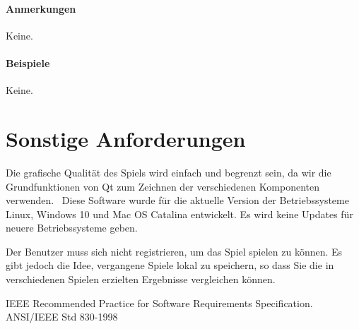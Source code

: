 \documentclass[a4paper, twosided, 11pt]{scrartcl}
\begin{document}
\paragraph{Anmerkungen} Keine.
\paragraph{Beispiele} Keine.

\section{Sonstige Anforderungen}

Die grafische Qualität des Spiels wird einfach und begrenzt sein, da wir die
Grundfunktionen von Qt zum Zeichnen der verschiedenen Komponenten verwenden. 
Diese Software wurde für die aktuelle Version der Betriebssysteme Linux,
Windows 10 und Mac OS Catalina entwickelt. Es wird keine Updates für neuere
Betriebssysteme geben.

Der Benutzer muss sich nicht registrieren, um das Spiel spielen zu können. Es
gibt jedoch die Idee, vergangene Spiele lokal zu speichern, so dass Sie die in
verschiedenen Spielen erzielten Ergebnisse vergleichen können.

\renewcommand{\refname}{Referenzen}
\begin{thebibliography}{2}
    IEEE Recommended Practice for Software Requirements Specification. ANSI/IEEE Std 830-1998
\end{thebibliography}
\end{document}
